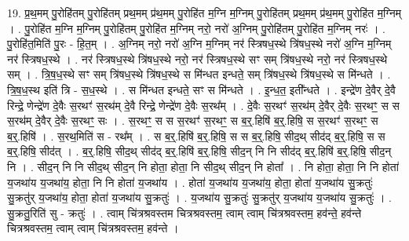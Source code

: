 \documentclass[17pt]{extarticle}
\begin{document}
19. प्र॒थ॒मम् पु॒रोहि॑तम् पु॒रोहि॑तम् प्रथ॒मम् प्र॑थ॒मम् पु॒रोहि॑त म॒ग्नि म॒ग्निम् पु॒रोहि॑तम् प्रथ॒मम् प्र॑थ॒मम् पु॒रोहि॑त म॒ग्निम् । . पु॒रोहि॑त म॒ग्नि म॒ग्निम् पु॒रोहि॑तम् पु॒रोहि॑त म॒ग्निम् नरो॒ नरो॑ अ॒ग्निम् पु॒रोहि॑तम् पु॒रोहि॑त म॒ग्निम् नरः॑ । . पु॒रोहि॑त॒मिति॑ पु॒रः - हि॒त॒म् । . अ॒ग्निम् नरो॒ नरो॑ अ॒ग्नि म॒ग्निम् नर॑ स्त्रिषध॒स्थे त्रि॑षध॒स्थे नरो॑ अ॒ग्नि म॒ग्निम् नर॑ स्त्रिषध॒स्थे । . नर॑ स्त्रिषध॒स्थे त्रि॑षध॒स्थे नरो॒ नर॑ स्त्रिषध॒स्थे सꣳ सम् त्रि॑षध॒स्थे नरो॒ नर॑ स्त्रिषध॒स्थे सम् । . त्रि॒ष॒ध॒स्थे सꣳ सम् त्रि॑षध॒स्थे त्रि॑षध॒स्थे स मि॑न्धत इन्धते॒ सम् त्रि॑षध॒स्थे त्रि॑षध॒स्थे स मि॑न्धते । . त्रि॒ष॒ध॒स्थ इति॑ त्रि - स॒ध॒स्थे । . स मि॑न्धत इन्धते॒ सꣳ स मि॑न्धते । . इ॒न्ध॒त॒ इती᳚न्धते । . इन्द्रे॑ण दे॒वैर् दे॒वै रिन्द्रे॒ णेन्द्रे॑ण दे॒वैः स॒रथꣳ॑ स॒रथ॑म् दे॒वै रिन्द्रे॒ णेन्द्रे॑ण दे॒वैः स॒रथ᳚म् । . दे॒वैः स॒रथꣳ॑ स॒रथ॑म् दे॒वैर् दे॒वैः स॒रथꣳ॒॒ स स स॒रथ॑म् दे॒वैर् दे॒वैः स॒रथꣳ॒॒ सः । . स॒रथꣳ॒॒ स स स॒रथꣳ॑ स॒रथꣳ॒॒ स ब॒र्॒.हिषि॑ ब॒र्॒.हिषि॒ स स॒रथꣳ॑ स॒रथꣳ॒॒ स ब॒र्॒.हिषि॑ । . स॒रथ॒मिति॑ स - रथ᳚म् । . स ब॒र्॒.हिषि॑ ब॒र्॒.हिषि॒ स स ब॒र्॒.हिषि॒ सीद॒थ् सीद॑द् ब॒र्॒.हिषि॒ स स ब॒र्॒.हिषि॒ सीद॑त् । . ब॒र्॒.हिषि॒ सीद॒थ् सीद॑द् ब॒र्॒.हिषि॑ ब॒र्॒.हिषि॒ सीद॒न् नि नि सीद॑द् ब॒र्॒.हिषि॑ ब॒र्॒.हिषि॒ सीद॒न् नि । . सीद॒न् नि नि सीद॒थ् सीद॒न् नि होता॒ होता॒ नि सीद॒थ् सीद॒न् नि होता᳚ । . नि होता॒ होता॒ नि नि होता॑ य॒जथा॑य य॒जथा॑य॒ होता॒ नि नि होता॑ य॒जथा॑य । . होता॑ य॒जथा॑य य॒जथा॑य॒ होता॒ होता॑ य॒जथा॑य सु॒क्रतुः॑ सु॒क्रतु॑र् य॒जथा॑य॒ होता॒ होता॑ य॒जथा॑य सु॒क्रतुः॑ । . य॒जथा॑य सु॒क्रतुः॑ सु॒क्रतु॑र् य॒जथा॑य य॒जथा॑य सु॒क्रतुः॑ । . सु॒क्रतु॒रिति॑ सु - क्रतुः॑ । . त्वाम् चि॑त्रश्रवस्तम चित्रश्रवस्तम॒ त्वाम् त्वाम् चि॑त्रश्रवस्तम॒ हव॑न्ते॒ हव॑न्ते चित्रश्रवस्तम॒ त्वाम् त्वाम् चि॑त्रश्रवस्तम॒ हव॑न्ते । \newline
\end{document}
